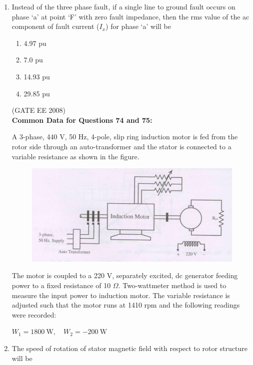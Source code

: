 \documentclass[journal,12pt,onecolumn]{IEEEtran}
\theoremstyle{remark}
\begin{document}
\begin{enumerate}[start=1, label=Q.\arabic*]
\item Instead of the three phase fault, if a single line to ground fault occurs on phase `a' at point `F' with zero fault impedance, then the rms value of the ac component of fault current ($I_x$) for phase `a' will be
\begin{multicols}{4}
\begin{enumerate}[label=(\Alph*)]
    \item 4.97 pu
    \item 7.0 pu
    \item 14.93 pu
    \item 29.85 pu
\end{enumerate}
\end{multicols}
\hfill (GATE EE 2008) \\[5mm]



\textbf{Common Data for Questions 74 and 75:}

A 3-phase, 440 V, 50 Hz, 4-pole, slip ring induction motor is fed from the rotor side through an auto-transformer and the stator is connected to a variable resistance as shown in the figure.

\begin{figure}[H]
    \centering
    \includegraphics[width=\columnwidth]{Fig/comp2.png}
\end{figure}


The motor is coupled to a 220 V, separately excited, dc generator feeding power to a fixed resistance of 10 $\Omega$. Two-wattmeter method is used to measure the input power to induction motor. The variable resistance is adjusted such that the motor runs at 1410 rpm and the following readings were recorded:  


$W_1 = 1800~\text{W}, \quad W_2 = -200~\text{W}$  \\[5mm]


\item The speed of rotation of stator magnetic field with respect to rotor structure will be


\end{enumerate}
\end{document}

